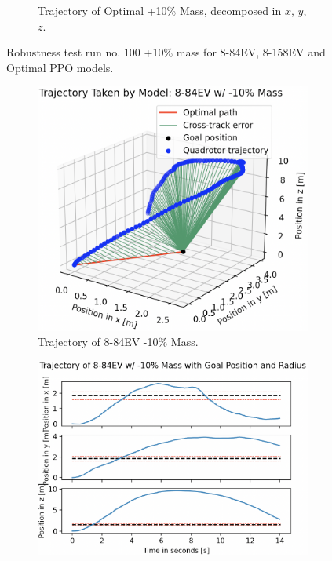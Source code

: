 \begin{figure}[H]
\begin{subfigure}[b]{0.49\textwidth}
         \caption{Trajectory of Optimal +10\% Mass, decomposed in $x$, $y$, $z$.}
         \label{fig:testing_robust+10_ppoOptimal2}
     \end{subfigure}
    \captionsetup{justification=centering}
    \caption{Robustness test run no. 100 +10\% mass for 8-84EV, 8-158EV and Optimal PPO models.}
     \label{fig:5_testing_robust+10_PPO}
\end{figure}

\begin{figure}[H]
     \centering
     \begin{subfigure}[b]{0.48\textwidth}
         \centering
         \captionsetup{justification=centering}
         \includegraphics[width=\textwidth]{figures/5_/Testing/ppo_test_robust-10-884EV1.png}
         \caption{Trajectory of 8-84EV -10\% Mass.}
         \label{fig:testing_robust-10_ppo884EV1}
     \end{subfigure} 
     \hfill 
    \begin{subfigure}[b]{0.49\textwidth}
         \centering
         \captionsetup{justification=centering}
         \includegraphics[width=\textwidth]{figures/5_/Testing/ppo_test_robust-10-884EV2.png}

\end{subfigure}
\end{figure}
